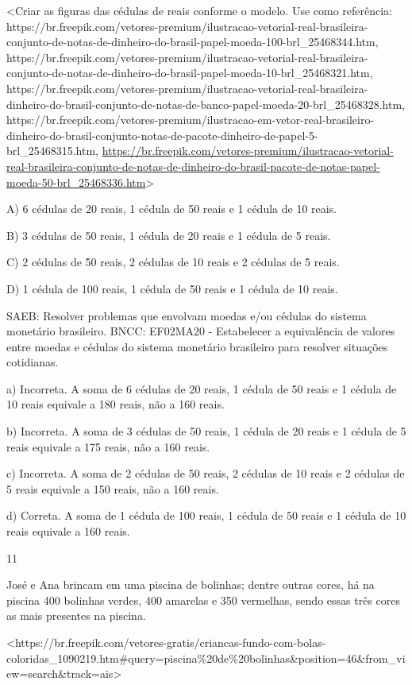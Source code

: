 \begin{escolha}
\begin{escolha}
{{{{\textless{}Criar as figuras das cédulas de reais conforme o modelo. Use
como referência:
https://br.freepik.com/vetores-premium/ilustracao-vetorial-real-brasileira-conjunto-de-notas-de-dinheiro-do-brasil-papel-moeda-100-brl\_25468344.htm,
https://br.freepik.com/vetores-premium/ilustracao-vetorial-real-brasileira-conjunto-de-notas-de-dinheiro-do-brasil-papel-moeda-10-brl\_25468321.htm,
https://br.freepik.com/vetores-premium/ilustracao-vetorial-real-brasileira-dinheiro-do-brasil-conjunto-de-notas-de-banco-papel-moeda-20-brl\_25468328.htm,
https://br.freepik.com/vetores-premium/ilustracao-em-vetor-real-brasileiro-dinheiro-do-brasil-conjunto-notas-de-pacote-dinheiro-de-papel-5-brl\_25468315.htm,
\url{https://br.freepik.com/vetores-premium/ilustracao-vetorial-real-brasileira-conjunto-de-notas-de-dinheiro-do-brasil-pacote-de-notas-papel-moeda-50-brl_25468336.htm}\textgreater{}

A) 6 cédulas de 20 reais, 1 cédula de 50 reais e 1 cédula de 10 reais.

B) 3 cédulas de 50 reais, 1 cédula de 20 reais e 1 cédula de 5 reais.

C) 2 cédulas de 50 reais, 2 cédulas de 10 reais e 2 cédulas de 5 reais.

D) 1 cédula de 100 reais, 1 cédula de 50 reais e 1 cédula de 10 reais.

SAEB: Resolver problemas que envolvam moedas e/ou cédulas do
sistema monetário brasileiro. BNCC: EF02MA20 - Estabelecer a
equivalência de valores entre moedas e cédulas do sistema monetário
brasileiro para resolver situações cotidianas.

a) Incorreta. A soma de 6 cédulas de 20 reais, 1 cédula de 50 reais e 1
cédula de 10 reais equivale a 180 reais, não a 160 reais.

b) Incorreta. A soma de 3 cédulas de 50 reais, 1 cédula de 20 reais e 1
cédula de 5 reais equivale a 175 reais, não a 160 reais.

c) Incorreta. A soma de 2 cédulas de 50 reais, 2 cédulas de 10 reais e 2
cédulas de 5 reais equivale a 150 reais, não a 160 reais.

d) Correta. A soma de 1 cédula de 100 reais, 1 cédula de 50 reais e 1
cédula de 10 reais equivale a 160 reais.

\num{11}

José e Ana brincam em uma piscina de bolinhas; dentre outras cores, há
na piscina 400 bolinhas verdes, 400 amarelas e 350 vermelhas, sendo
essas três cores as mais presentes na piscina.

\textless{}https://br.freepik.com/vetores-gratis/criancas-fundo-com-bolas-coloridas\_1090219.htm\#query=piscina\%20de\%20bolinhas\&position=46\&from\_view=search\&track=ais\textgreater{}

}}}}
\end{escolha}
\end{escolha}
